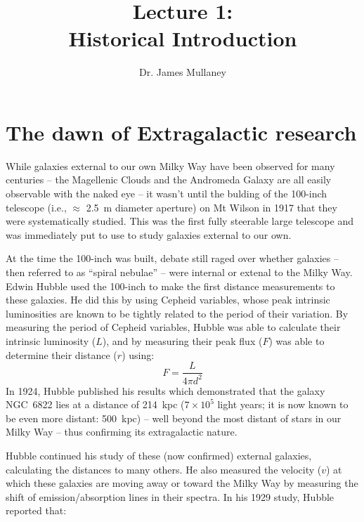 \documentclass[11pt]{article}
\begin{document}
 
\title{Lecture 1:\\Historical Introduction}
\author{Dr. James Mullaney}
\maketitle

\section{The dawn of Extragalactic research}
While galaxies external to our own Milky Way have been observed for
many centuries -- the Magellenic Clouds and the Andromeda Galaxy are
all easily observable with the naked eye -- it wasn't until the
bulding of the 100-inch telescope (i.e., $\approx$ 2.5~m diameter
aperture) on Mt Wilson in 1917 that they were systematically studied. This was
the first fully steerable large telescope and was immediately put to
use to study galaxies external to our own. 

At the time the 100-inch was built, debate still raged over whether
galaxies -- then referred to as ``spiral nebulae'' -- were internal or
extenal to the Milky Way. Edwin Hubble used the 100-inch to make the
first distance measurements to these galaxies. He did this by using
Cepheid variables, whose peak intrinsic luminosities are known to be
tightly related to the period of their variation. By measuring the
period of Cepheid variables, Hubble was able to calculate their
intrinsic luminosity ($L$), and by measuring their peak flux ($F$) was
able to determine their distance ($r$) using:
\begin{equation}
F = \frac{L}{4\pi d^2}
\end{equation}
In 1924, Hubble published his results which demonstrated that the
galaxy NGC~6822 lies at a distance of 214~kpc ($7\times10^5$ light
years; it is now known to be even more distant: 500~kpc) -- well
beyond the most distant of stars in our Milky Way -- thus confirming
its extragalactic nature.

Hubble continued his study of these (now confirmed) external galaxies,
calculating the distances to many others. He also measured the
velocity ($v$) at which these galaxies are moving away or toward the
Milky Way by measuring the shift of emission/absorption lines in their
spectra. In his 1929 study, Hubble reported that:
\end{document}
